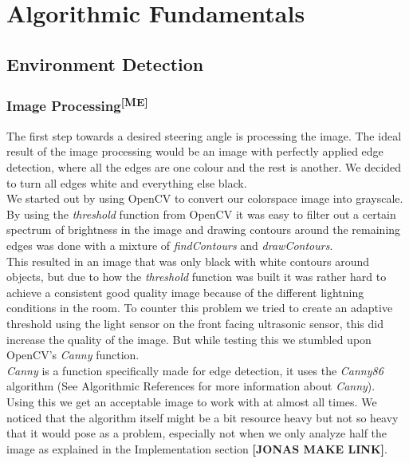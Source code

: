 \chapter{Algorithmic Fundamentals}
\section{Environment Detection}
\subsection[Image Processing]{Image Processing\textsuperscript{[ME]}}
The first step towards a desired steering angle is processing the image. The
ideal result of the image processing would be an image with perfectly applied
edge detection, where all the edges are one colour and the rest is another. We
decided to turn all edges white and everything else black.\\
We started out by using OpenCV to convert our colorspace image into grayscale.
By using the \textit{threshold} function from OpenCV it was easy to filter out a
certain spectrum of brightness in the image and drawing contours around the
remaining edges was done with a mixture of \textit{findContours} and
\textit{drawContours}.\\
This resulted in an image that was only black with white contours around
objects, but due to how the \textit{threshold} function was built it was rather
hard to achieve a consistent good quality image because of the different
lightning conditions in the room. To counter this problem we tried to create an
adaptive threshold using the light sensor on the front facing ultrasonic sensor,
this did increase the quality of the image. But while testing this we stumbled
upon OpenCV's \textit{Canny} function.\\

\noindent
\textit{Canny} is a function specifically made for edge detection, it uses the
\textit{Canny86} algorithm (See Algorithmic References for more information
about \textit{Canny}).\\
Using this we get an acceptable image to work with at almost all times. We
noticed that the algorithm itself might be a bit resource heavy but not so heavy
that it would pose as a problem, especially not when we only analyze half the
image as explained in the Implementation section \textbf{[JONAS MAKE LINK]}.

